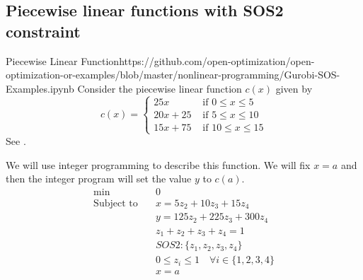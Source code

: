 \subsection{Piecewise linear functions with SOS2 constraint}
\begin{examplewithcode}{Piecewise Linear Function}{https://github.com/open-optimization/open-optimization-or-examples/blob/master/nonlinear-programming/Gurobi-SOS-Examples.ipynb}
\label{example:pwl}
Consider the piecewise linear function 
 $c(x)$ given by
$$
c(x) = 
\begin{cases}
25x  & \text{ if } 0 \leq x \leq 5\\
20x + 25 & \text{ if } 5 \leq x \leq 10\\
15x + 75 & \text{ if } 10 \leq x \leq 15
\end{cases}
$$
See .

We will use integer programming to describe this function.  We will fix $x = a$ and then the integer program will set the value $y$ to $c(a)$.
\begin{align*}
\min\quad & 0\\
\text{Subject to} \quad & x = 5 z_{2} +10 z_{3} + 15 z_{4}\\
 & y = 125 z_{2} + 225 z_{3} + 300 z_{4}\\
 & z_{1} + z_{2} + z_{3} + z_{4} = 1\\
 & SOS2: \{z_1, z_2, z_3, z_4\}\\
 & 0 \leq z_{i} \leq 1 \quad\forall i \in \{1,2,3,4\}\\
 & x = a\\
\end{align*}

\end{examplewithcode}

